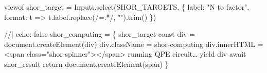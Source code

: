\documentclass[
  11pt,
  letterpaper,
  oneside]{scrbook}
\newenvironment{Shaded}{\begin{snugshade}}{\end{snugshade}}
\newcommand{\NormalTok}[1]{\textcolor[rgb]{0.00,0.23,0.31}{#1}}
\begin{document}
\begin{Shaded}
\begin{Highlighting}[]
\NormalTok{viewof shor\_target = Inputs.select(SHOR\_TARGETS, \{}
\NormalTok{  label: "N to factor",}
\NormalTok{  format: t =\textgreater{} t.label.replace(/=.*/, "").trim()}
\NormalTok{\})}
\end{Highlighting}
\end{Shaded}

\begin{Shaded}
\begin{Highlighting}[]
\NormalTok{//| echo: false}
\NormalTok{shor\_computing = \{}
\NormalTok{  shor\_target}
\NormalTok{  const div = document.createElement(\textquotesingle{}div\textquotesingle{})}
\NormalTok{  div.className = \textquotesingle{}shor{-}computing\textquotesingle{}}
\NormalTok{  div.innerHTML = \textquotesingle{}\textless{}span class="shor{-}spinner"\textgreater{}\textless{}/span\textgreater{} running QPE circuit…\textquotesingle{}}
\NormalTok{  yield div}
\NormalTok{  await shor\_result}
\NormalTok{  return document.createElement(\textquotesingle{}span\textquotesingle{})}
\NormalTok{\}}
\end{Highlighting}
\end{Shaded}
\end{document}

